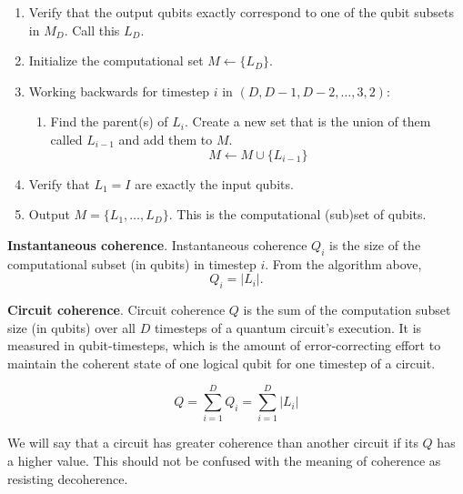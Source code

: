 \begin{enumerate}
\begin{enumerate}
\item
Verify that the output qubits exactly correspond to one of the qubit subsets
in $M_D$. Call this $L_D$.
\item
Initialize the computational set $M \leftarrow \{ L_D \}$.
\item
Working backwards for timestep $i$ in $(D, D-1, D-2, \ldots, 3, 2)$:
\begin{enumerate}
\item
Find the parent(s) of $L_i$. Create a new set that is the union of them called $L_{i-1}$
and add them to $M$.
\begin{equation}
M \leftarrow M \cup \{L_{i-1}\}
\end{equation}
\end{enumerate}

\item Verify that $L_1 = I$ are exactly the input qubits.

\item Output $M = \{L_1, \ldots, L_D\}$. This is the computational (sub)set of qubits.
\end{enumerate}

\end{enumerate}

\begin{definition}{\textbf{Instantaneous coherence}.}
Instantaneous coherence $Q_i$ is the size of the computational subset
(in qubits) in timestep $i$. From the algorithm above,
\begin{equation}
Q_i = |L_i|\text{.}
\end{equation}
\end{definition}

\begin{definition}{\textbf{Circuit coherence}.}
Circuit coherence $Q$ is the sum of the computation subset size (in qubits)
over all $D$ timesteps of a quantum circuit's execution. It is measured
in qubit-timesteps, which is the amount of error-correcting effort to
maintain the coherent state of one logical qubit for one timestep of a circuit.

\begin{equation}
Q = \sum_{i=1}^D Q_i = \sum_{i=1}^D |L_i|
\end{equation}
\end{definition}

We will say that a circuit has greater coherence than another circuit if
its $Q$ has a higher value. This should not be confused with the
meaning of coherence as resisting decoherence.

